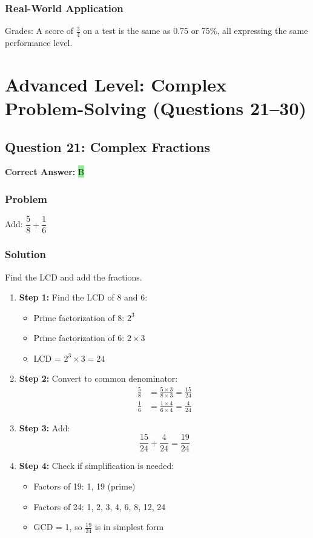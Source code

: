 \documentclass[12pt]{article}
\begin{document}
\subsubsection*{Real-World Application}
Grades: A score of $\frac{3}{4}$ on a test is the same as 0.75 or 75\%, all expressing the same performance level.

\newpage

\section{Advanced Level: Complex Problem-Solving (Questions 21--30)}

\subsection{Question 21: Complex Fractions}

\textbf{Correct Answer: } \colorbox{lightgreen}{B}

\subsubsection*{Problem}
Add: $\dfrac{5}{8} + \dfrac{1}{6}$

\subsubsection*{Solution}

Find the LCD and add the fractions.

\begin{enumerate}
\item \textbf{Step 1:} Find the LCD of 8 and 6:
  \begin{itemize}
  \item Prime factorization of 8: $2^3$
  \item Prime factorization of 6: $2 \times 3$
  \item LCD = $2^3 \times 3 = 24$
  \end{itemize}
\item \textbf{Step 2:} Convert to common denominator:
  \begin{align*}
  \frac{5}{8} &= \frac{5 \times 3}{8 \times 3} = \frac{15}{24} \\
  \frac{1}{6} &= \frac{1 \times 4}{6 \times 4} = \frac{4}{24}
  \end{align*}
\item \textbf{Step 3:} Add:
  \[
  \frac{15}{24} + \frac{4}{24} = \frac{19}{24}
  \]
\item \textbf{Step 4:} Check if simplification is needed:
  \begin{itemize}
  \item Factors of 19: 1, 19 (prime)
  \item Factors of 24: 1, 2, 3, 4, 6, 8, 12, 24
  \item GCD = 1, so $\frac{19}{24}$ is in simplest form
  \end{itemize}
\end{enumerate}
\end{document}
